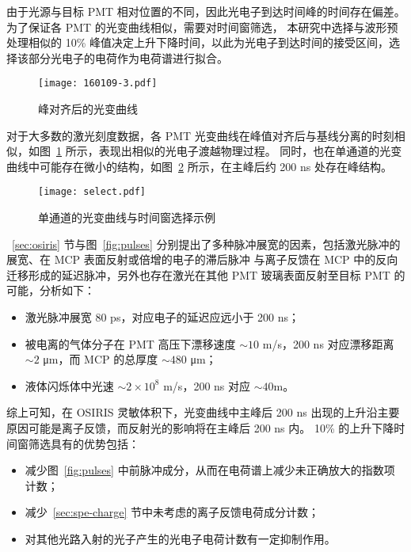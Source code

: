 由于光源与目标 PMT 相对位置的不同，因此光电子到达时间峰的时间存在偏差。为了保证各 PMT 的光变曲线相似，需要对时间窗筛选，
本研究中选择与波形预处理相似的 10\% 峰值决定上升下降时间，以此为光电子到达时间的接受区间，选择该部分光电子的电荷作为电荷谱进行拟合。

\begin{figure}
    \centering
    \texttt{[image: 160109-3.pdf]}
    \caption{峰对齐后的光变曲线}
    \label{fig:lcs}
\end{figure}

对于大多数的激光刻度数据，各 PMT 光变曲线在峰值对齐后与基线分离的时刻相似，如图~\ref{fig:lcs} 所示，表现出相似的光电子渡越物理过程。
同时，也在单通道的光变曲线中可能存在微小的结构，如图~\ref{fig:selection} 所示，在主峰后约 200 ns 处存在峰结构。
\begin{figure}
    \centering
    \texttt{[image: select.pdf]}
    \caption*{在 PMT ID 为 1 的通道中，观测到了光变曲线末端具有部分峰的上升结构。红色区间为 10\% 上升下降沿筛选电荷的区间。}
    \caption{单通道的光变曲线与时间窗选择示例}
    \label{fig:selection}
\end{figure}

~\ref{sec:osiris} 节与图~\ref{fig:pulses} 分别提出了多种脉冲展宽的因素，包括激光脉冲的展宽、在 MCP 表面反射或倍增的电子的滞后脉冲
与离子反馈在 MCP 中的反向迁移形成的延迟脉冲，另外也存在激光在其他 PMT 玻璃表面反射至目标 PMT 的可能，分析如下：
\begin{itemize}
    \item 激光脉冲展宽 80 ps，对应电子的延迟应远小于 200 ns；
    \item 被电离的气体分子在 PMT 高压下漂移速度 $\sim10$ m/s，200 ns 对应漂移距离 $\sim2$ μm，而 MCP 的总厚度 $\sim480$ μm；
    \item 液体闪烁体中光速 $\sim2\times10^{8}$ m/s，200 ns 对应 $\sim40$m。
\end{itemize}

综上可知，在 OSIRIS 灵敏体积下，光变曲线中主峰后 200 ns 出现的上升沿主要原因可能是离子反馈，而反射光的影响将在主峰后 200 ns 内。
10\% 的上升下降时间窗筛选具有的优势包括：
\begin{itemize}
    \item 减少图~\ref{fig:pulses} 中前脉冲成分，从而在电荷谱上减少未正确放大的指数项计数；
    \item 减少~\ref{sec:spe-charge} 节中未考虑的离子反馈电荷成分计数；
    \item 对其他光路入射的光子产生的光电子电荷计数有一定抑制作用。
\end{itemize}

